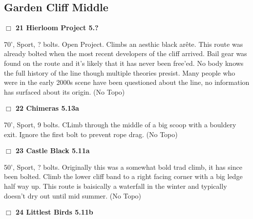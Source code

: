 \begin{multicols}{2}
\needspace{10em}
\subsection*{Garden Cliff Middle}\label{bf:Garden Cliff Middle}




\needspace{2em}
\label{rt:Hierloom Project}
\colorbox{black!20}{
\parbox{0.95\linewidth}{
\hspace{-1ex}\textbf{$\Box$
21 Hierloom Project 5.?  
}}}
\begin{adjustwidth}{1.3em}{}			

70', Sport, ? bolts. Open Project. Climbs an aesthic black arête. This route was already bolted when the most recent developers of the cliff arrived. Bail gear was found on the route and it's likely that it has never been free'ed. No body knows the full history of the line though multiple theories presist. Many people who were in the early 2000s scene have been questioned about the line, no information has surfaced about its origin.
  (No Topo)
\end{adjustwidth}




\needspace{2em}
\label{rt:Chimeras}
\colorbox{Goldenrod!20}{
\parbox{0.95\linewidth}{
\hspace{-1ex}\textbf{$\Box$
22 Chimeras 5.13a  
}}}
\begin{adjustwidth}{1.3em}{}			

70', Sport, 9 bolts. CLimb through the middle of a big scoop with a bouldery exit. Ignore the first bolt to prevent rope drag.
  (No Topo)
\end{adjustwidth}




\needspace{2em}
\label{rt:Castle Black}
\colorbox{RoyalBlue!20}{
\parbox{0.95\linewidth}{
\hspace{-1ex}\textbf{$\Box$
23 Castle Black 5.11a  
}}}
\begin{adjustwidth}{1.3em}{}			

50', Sport, ? bolts. Originally this was a somewhat bold trad climb, it has since been bolted. Climb the lower cliff band to a right facing corner with a big ledge half way up. This route is baisically a waterfall in the winter and typically doesn't dry out until mid summer.
  (No Topo)
\end{adjustwidth}




\needspace{2em}
\label{rt:Littlest Birds}
\colorbox{RoyalBlue!20}{
\parbox{0.95\linewidth}{
\hspace{-1ex}\textbf{$\Box$
24 Littlest Birds 5.11b  
}}}
\begin{adjustwidth}{1.3em}{}			


\end{adjustwidth}
\end{multicols}
